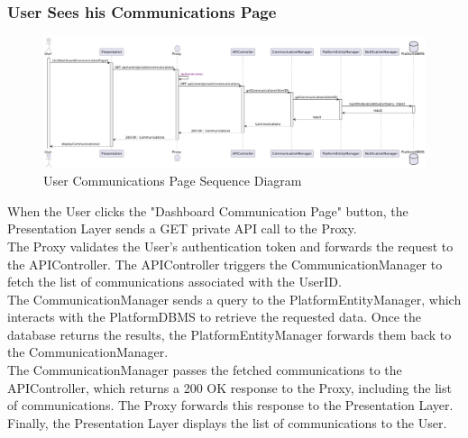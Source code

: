 \subsubsection*{User Sees his Communications Page}
\begin{figure}[H]
    \centering
    \includegraphics[width=\linewidth]{Latex/Images/DD/SequenceDiagrams/18UserSeesHisCommunicationsPage.png}
    \caption{User Communications Page Sequence Diagram}
    \label{fig:uscommpage}
\end{figure}
When the User clicks the "Dashboard Communication Page" button, the Presentation Layer sends a GET private API call to the Proxy.\\
The Proxy validates the User's authentication token and forwards the request to the APIController. The APIController triggers the CommunicationManager to fetch the list of communications associated with the UserID.\\
The CommunicationManager sends a query to the PlatformEntityManager, which interacts with the PlatformDBMS to retrieve the requested data. Once the database returns the results, the PlatformEntityManager forwards them back to the CommunicationManager.\\
The CommunicationManager passes the fetched communications to the APIController, which returns a 200 OK response to the Proxy, including the list of communications. The Proxy forwards this response to the Presentation Layer.\\
Finally, the Presentation Layer displays the list of communications to the User.

